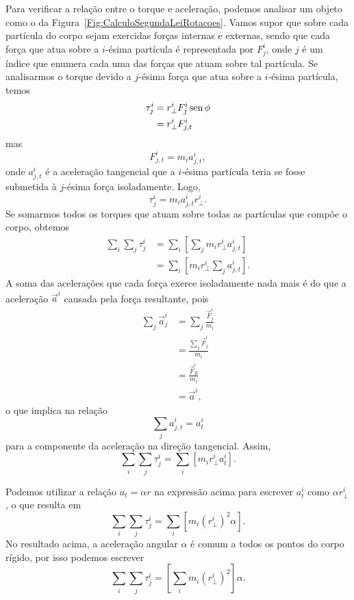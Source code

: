 Para verificar a relação entre o torque e aceleração, podemos analisar um objeto como o da Figura~\ref{Fig:CalculoSegundaLeiRotacoes}. Vamos supor que sobre cada partícula do corpo sejam exercidas forças internas e externas, sendo que cada força que atua sobre a $i$-ésima partícula é representada por $F_j^i$, onde $j$ é um índice que enumera cada uma das forças que atuam sobre tal partícula. Se analisarmos o torque devido a $j$-ésima força que atua sobre a $i$-ésima partícula, temos
\begin{align}
	\tau_j^i &= r_\perp^i F_j^i \operatorname{sen}\phi \\
	&= r_\perp^i F_{j,t}^i
\end{align}
%
mas
\begin{equation}
	F_{j,t}^{i} = m_i a_{j,t}^{i},
\end{equation}
%
onde $a_{j,t}^i$ é a aceleração  tangencial que a $i$-ésima partícula teria se fosse submetida à $j$-ésima força isoladamente.
%
Logo,
\begin{equation}
	\tau_j^i = m_i a_{j,t}^{i} r_\perp^i.
\end{equation}
%
Se somarmos todos os torques que atuam sobre todas as partículas que compõe o corpo, obtemos
\begin{align}
	\sum_i \sum_j \tau_j^i &= \sum_{i}\left[ \sum_j m_i r_\perp^i a_{j,t}^i\right] \\
	&= \sum_{i}\left[m_i r_\perp^i \sum_j a_{j,t}^i\right].
\end{align}
%
A soma das acelerações que cada força exerce isoladamente nada mais é do que a aceleração $\vec{a}^i$ causada pela força resultante, pois
\begin{align}
    \sum_j \vec{a}_{j}^i &= \sum_j \frac{\vec{F}_{j}^i}{m_i} \\
    &= \frac{\sum_j \vec{F}_j^i}{m_i} \\
    &= \frac{\vec{F}_R^i}{m_i} \\
    &= \vec{a}^i,
\end{align}
%
o que implica na relação
\begin{equation}
    \sum_j a_{j,t}^i = a_t^i
\end{equation}
%
para a componente da aceleração na direção tangencial. Assim,
\begin{equation}
	\sum_i \sum_j \tau_j^i = \sum_{i}[m_i r_\perp^i a_{t}^i].
\end{equation}

Podemos utilizar a relação $a_t = \alpha r$ na expressão acima para escrever $a_{t}^i$ como $\alpha r_\perp^i$, o que resulta em
\begin{equation}
	\sum_i \sum_j \tau_j^i = \sum_{i}[m_i (r_\perp^i)^2 \alpha].
\end{equation}
%
No resultado acima, a aceleração angular $\alpha$ é comum a todos os pontos do corpo rígido, por isso podemos escrever
\begin{equation}
	\sum_i \sum_j \tau_j^i =  \left[\sum_{i} m_i (r_\perp^i)^2\right] \alpha.
\end{equation}

